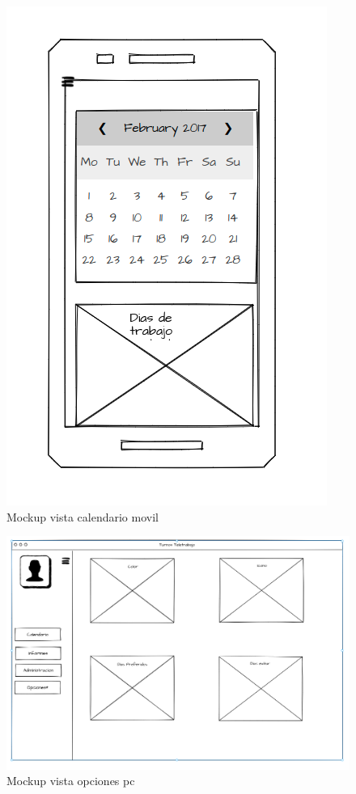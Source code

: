 \documentclass[11pt,spanish,listoffigures,listoftables]{tfgetsinf}
\begin{document}
 \begin{figure}[h!] %
   \includegraphics[width=\linewidth]{img/Vista_Calendario_MVL.png}
   \caption{Mockup vista calendario movil}
   \label{fig:calendarioMVL}
 \end{figure}

 \begin{figure}[h!] %
   \includegraphics[width=\linewidth]{img/Vista_Opciones_PC.png}
   \caption{Mockup vista opciones pc}
   \label{fig:opcionesPC}
 \end{figure}
\end{document}
